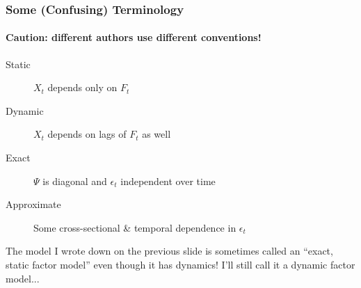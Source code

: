 \documentclass[handout]{beamer}
\begin{document}
\begin{frame}[c]\frametitle{Some (Confusing) Terminology}
\framesubtitle{Caution: different authors use different conventions!}
 
\begin{description}
	\item[Static] $X_t$ depends only on $F_t$
	\item[Dynamic] $X_t$ depends on lags of $F_t$ as well
	\item[Exact] $\Psi$ is diagonal and $\epsilon_t$ independent over time
	\item[Approximate] Some cross-sectional \& temporal dependence in $\epsilon_t$
\end{description}

\vspace{1em}

\alert{The model I wrote down on the previous slide is sometimes called an ``exact, static factor model'' even though it has dynamics! I'll still call it a dynamic factor model...}

\end{frame}
\end{document}
